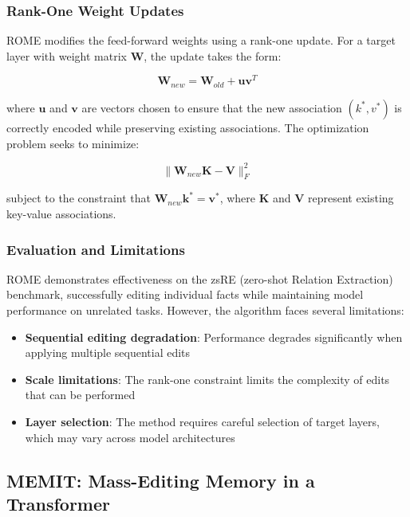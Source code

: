 \subsubsection{Rank-One Weight Updates}

ROME modifies the feed-forward weights using a rank-one update. For a target layer with weight matrix $\mathbf{W}$, the update takes the form:

\begin{equation}
\mathbf{W}_{new} = \mathbf{W}_{old} + \mathbf{u}\mathbf{v}^T
\end{equation}

where $\mathbf{u}$ and $\mathbf{v}$ are vectors chosen to ensure that the new association $(k^*, v^*)$ is correctly encoded while preserving existing associations. The optimization problem seeks to minimize:

\begin{equation}
\|\mathbf{W}_{new}\mathbf{K} - \mathbf{V}\|_F^2
\end{equation}

subject to the constraint that $\mathbf{W}_{new}\mathbf{k}^* = \mathbf{v}^*$, where $\mathbf{K}$ and $\mathbf{V}$ represent existing key-value associations.

\subsubsection{Evaluation and Limitations}

ROME demonstrates effectiveness on the zsRE (zero-shot Relation Extraction) benchmark, successfully editing individual facts while maintaining model performance on unrelated tasks. However, the algorithm faces several limitations:

\begin{itemize}
    \item \textbf{Sequential editing degradation}: Performance degrades significantly when applying multiple sequential edits
    \item \textbf{Scale limitations}: The rank-one constraint limits the complexity of edits that can be performed
    \item \textbf{Layer selection}: The method requires careful selection of target layers, which may vary across model architectures
\end{itemize}

\subsection{MEMIT: Mass-Editing Memory in a Transformer}

